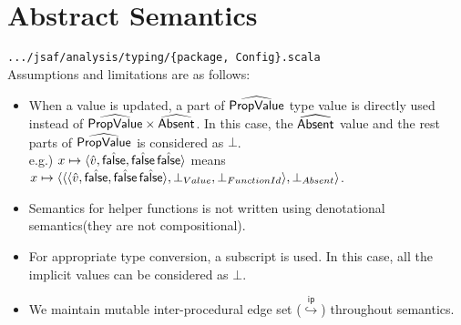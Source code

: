 \documentclass{article}
\newcommand{\SF}[1]{\mbox{\textsf{#1}}}
\newcommand{\ipnext}{\stackrel{\mathsf{ip}}{\hookrightarrow}}
\newcommand{\abs}[1]{\widehat{\SF{#1}}}
\newcommand{\afalse}{\hat{\SF{false}}}
\def\inblue{\color{blue}}
\begin{document}
\newpage
\section{Abstract Semantics}
{\inblue\tt .../jsaf/analysis/typing/\{package, Config\}.scala}\\

Assumptions and limitations are as follows:
\begin{itemize}
  \item When a value is updated, a part of $\abs{PropValue}$ type value is directly used instead of $\abs{PropValue}\times\abs{Absent}$. In this case, the $\abs{Absent}$ value and the rest parts of $\abs{PropValue}$ is considered as $\bot$.\\ e.g.) $x\mapsto \langle\hat{v},\afalse,\afalse\,\afalse\rangle$ means $x\mapsto \langle\langle\langle\hat{v},\afalse,\afalse\,\afalse\rangle,\bot_{Value},\bot_{FunctionId}\rangle,\bot_{Absent}\rangle$.

  \item Semantics for helper functions is not written using denotational semantics(they are not compositional).
  \item For appropriate type conversion, a subscript is used. In this case, all the implicit values can be
    considered as $\bot$.
  \item We maintain mutable inter-procedural edge set ($\ipnext$) throughout semantics.
\end{itemize}
\end{document}
